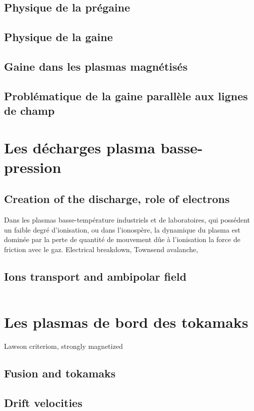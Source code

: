 			\subsection{Physique de la prégaine}
			\subsection{Physique de la gaine}
			\subsection{Gaine dans les plasmas magnétisés}
			\subsection{Problématique de la gaine parallèle aux lignes de champ}
	
	 \section{Les décharges plasma basse-pression}
		\subsection{Creation of the discharge, role of electrons}
		Dans les plasmas basse-température industriels et de laboratoires, qui possédent
			un faible degré d'ionisation, ou dans l'ionospère, la dynamique du plasma est dominée par
			la perte de quantité de mouvement dûe à l'ionisation la force de friction avec le gaz.
		Electrical breakdown, Townsend avalanche, 
		\subsection{Ions transport and ambipolar field}
		\begin{equation}
			\label{derivediffusion}
		\end{equation}
	\section{Les plasmas de bord des tokamaks}
		Lawson criteriom, strongly magnetized
		\subsection{Fusion and tokamaks}
		\subsection{Drift velocities}
		\label{vitessesDerive}

	

		